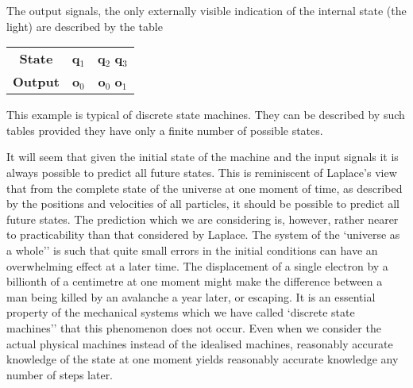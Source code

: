 \documentclass[10pt]{article} %
\begin{document}
The output signals, the only externally visible indication of the internal state (the light) are described by the table
\vspace{0.5\baselineskip} %

\begin{center}
    \normalfont %
    \begin{tabular}{ccc}
        \textbf{State} & \textbf{q$_1$} & \textbf{q$_2$} \textbf{q$_3$} \\
        \textbf{Output} & \textbf{o$_0$} & \textbf{o$_0$} \textbf{o$_1$} \\
    \end{tabular}
\end{center}
\vspace{0.5\baselineskip} %

This example is typical of discrete state machines. They can be described by such tables provided they have only a finite number of possible states.

It will seem that given the initial state of the machine and the input signals it is always possible to predict all future states. This is reminiscent of Laplace's view that from the complete state of the universe at one moment of time, as described by the positions and velocities of all particles, it should be possible to predict all future states. The prediction which we are considering is, however, rather nearer to practicability than that considered by Laplace. The system of the `universe as a whole'' is such that quite small errors in the initial conditions can have an overwhelming effect at a later time. The displacement of a single electron by a billionth of a centimetre at one moment might make the difference between a man being killed by an avalanche a year later, or escaping. It is an essential property of the mechanical systems which we have called `discrete state machines'' that this phenomenon does not occur. Even when we consider the actual physical machines instead of the idealised machines, reasonably accurate knowledge of the state at one moment yields reasonably accurate knowledge any number of steps later.
\end{document}

